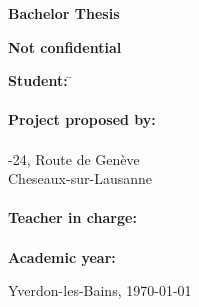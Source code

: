 
\begin{titlepage}
  \thispagestyle{firstpage}
  \begin{center}
    \vspace*{3cm}

    \Huge
    \textbf{Bachelor Thesis}

    \vspace{1cm}
    \Huge
    \TBtitle

    \vspace{0.2cm}
    \Large
    \textbf{Not confidential}
  \end{center}

  \vspace{7cm}
  \begin{tabbing}
    \linespread{3}\textbf{Student:} \hspace{12em} \= \TBauthor\\\\

    \textbf{Project proposed by:} \> \TBindustryContact\\
    \> \TBindustryName\\
    -24, Route de Genève\\
     Cheseaux-sur-Lausanne\\\\

    \textbf{Teacher in charge:} \> \TBsupervisor\\\\

    \textbf{Academic year:} \> \TBacademicYears
  \end{tabbing}

  \vspace{2.5cm}
  \begin{flushright}
    Yverdon-les-Bains, \today
  \end{flushright}
\end{titlepage}
